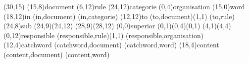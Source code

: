 \documentclass[a4paper,11pt]{article}
\begin{document}
\setlength{\hermunit}{.5cm}
\begin{schema}(30,15)
\entity(15,8){document}
%
\entity(6,12){rule}
%
\entity(24,12){categorie}
%
\entity(0,4){organisation}
%
\entity(15,0){word}
%
\relation(18,12){in}
\connection(in,document){}
\connection(in,categorie){}
%
\relation(12,12){to}
\connection(to,document){(1,1)}
\connection(to,rule){}
%
\relation(24,8){sub}
\connection*(24,9)(24,12){}
\connection*(28,9)(28,12){}
%
\relation(0,0){superior}
\connection*(0,1)(0,4){(0,1)}
\connection*(4,1)(4,4){}
%
\relation(0,12){responsible}
\connection(responsible,rule){(1,1)}
\connection(responsible,organisation){}
%
\relation(12,4){catchword}
\connection(catchword,document){}
\connection(catchword,word){}
%
\relation(18,4){content}
\connection(content,document){}
\connection(content,word){}
\end{schema}
\end{document}
